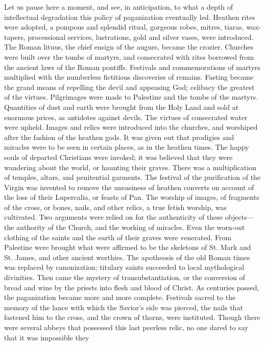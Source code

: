 Let us pause here a moment, and see, in anticipation, to what a depth of intellectual
degradation this policy of paganization eventually led. Heathen rites were adopted, a
pompous and splendid ritual, gorgeous robes, mitres, tiaras, wax-tapers, processional
services, lustrations, gold and silver vases, were introduced. The Roman lituus, the chief
ensign of the augurs, became the crozier. Churches were built over the tombs of martyrs, and
consecrated with rites borrowed from the ancient laws of the Roman pontiffs. Festivals and
commemorations of martyrs multiplied with the numberless fictitious discoveries of remains.
Fasting became the grand means of repelling the devil and appeasing God; celibacy the
greatest of the virtues. Pilgrimages were made to Palestine and the tombs of the martyrs.
Quantities of dust and earth were brought from the Holy Land and sold at enormous prices,
as antidotes against devils. The virtues of consecrated water were upheld. Images and relics
were introduced into the churches, and worshiped after the fashion of the heathen gods. It
was given out that prodigies and miracles were to be seen in certain places, as in the heathen
times. The happy souls of departed Christians were invoked; it was believed that they were
wandering about the world, or haunting their graves. There was a multiplication of temples,
altars, and penitential garments. The festival of the purification of the Virgin was invented to
remove the uneasiness of heathen converts on account of the loss of their Lupercalia, or
feasts of Pan. The worship of images, of fragments of the cross, or bones, nails, and other
relics, a true fetish worship, was cultivated. Two arguments were relied on for the
authenticity of these objects—the authority of the Church, and the working of miracles. Even
the worn-out clothing of the saints and the earth of their graves were venerated. From
Palestine were brought what were affirmed to be the skeletons of St. Mark and St. James, and
other ancient worthies. The apotheosis of the old Roman times was replaced by canonization;
titulary saints succeeded to local mythological divinities. Then came the mystery of
transubstantiation, or the conversion of bread and wine by the priests into flesh and blood of
Christ. As centuries passed, the paganization became more and more complete. Festivals
sacred to the memory of the lance with which the Savior's side was pierced, the nails that
fastened him to the cross, and the crown of thorns, were instituted. Though there were several
abbeys that possessed this last peerless relic, no one dared to say that it was impossible they
